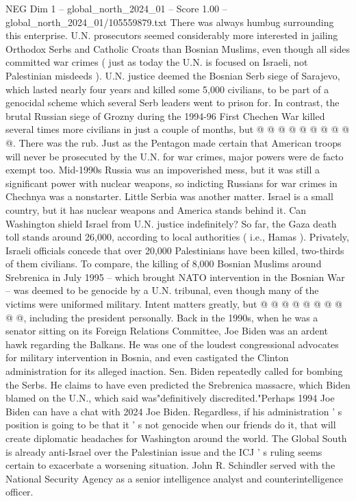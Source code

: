 \begin{textsample}{NEG Dim 1 – global\_north\_2024\_01 – Score 1.00 – global\_north\_2024\_01/105559879.txt}
There was always humbug surrounding this enterprise.
U.N. prosecutors seemed considerably more interested in jailing Orthodox Serbs and Catholic Croats than Bosnian Muslims, even though all sides committed war crimes ( just as today the U.N. is focused on Israeli, not Palestinian misdeeds ).
U.N. justice deemed the Bosnian Serb siege of Sarajevo, which lasted nearly four years and killed some 5,000 civilians, to be part of a genocidal scheme which several Serb leaders went to prison for.
In contrast, the brutal Russian siege of Grozny during the 1994-96 First Chechen War killed several times more civilians in just a couple of months, but @ @ @ @ @ @ @ @ @ @.
There was the rub.
Just as the Pentagon made certain that American troops will never be prosecuted by the U.N. for war crimes, major powers were de facto exempt too.
Mid-1990s Russia was an impoverished mess, but it was still a significant power with nuclear weapons, so indicting Russians for war crimes in Chechnya was a nonstarter.
Little Serbia was another matter.
Israel is a small country, but it has nuclear weapons and America stands behind it.
Can Washington shield Israel from U.N. justice indefinitely?
So far, the Gaza death toll stands around 26,000, according to local authorities ( i.e., Hamas ).
Privately, Israeli officials concede that over 20,000 Palestinians have been killed, two-thirds of them civilians.
To compare, the killing of 8,000 Bosnian Muslims around Srebrenica in July 1995 -- which brought NATO intervention in the Bosnian War -- was deemed to be genocide by a U.N. tribunal, even though many of the victims were uniformed military.
Intent matters greatly, but @ @ @ @ @ @ @ @ @ @, including the president personally.
Back in the 1990s, when he was a senator sitting on its Foreign Relations Committee, Joe Biden was an ardent hawk regarding the Balkans.
He was one of the loudest congressional advocates for military intervention in Bosnia, and even castigated the Clinton administration for its alleged inaction.
Sen.
Biden repeatedly called for bombing the Serbs.
He claims to have even predicted the Srebrenica massacre, which Biden blamed on the U.N., which said was"definitively discredited."Perhaps 1994 Joe Biden can have a chat with 2024 Joe Biden.
Regardless, if his administration ' s position is going to be that it ' s not genocide when our friends do it, that will create diplomatic headaches for Washington around the world.
The Global South is already anti-Israel over the Palestinian issue and the ICJ ' s ruling seems certain to exacerbate a worsening situation.
John R.
Schindler served with the National Security Agency as a senior intelligence analyst and counterintelligence officer.

\end{textsample}
